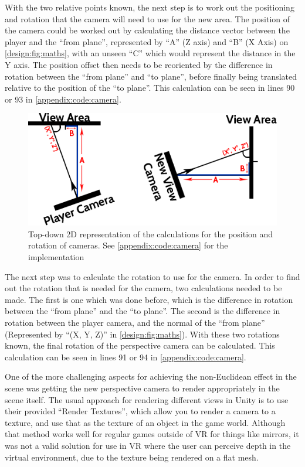 		With the two relative points known, the next step is to work out the positioning and rotation that the camera will need to use for the new area.
		The position of the camera could be worked out by calculating the distance vector between the player and the \enquote{from plane}, represented by \enquote{A} (Z axis) and \enquote{B} (X Axis) on \autoref{design:fig:maths}, with an unseen \enquote{C} which would represent the distance in the Y axis.
		The position offset then needs to be reoriented by the difference in rotation between the \enquote{from plane} and \enquote{to plane}, before finally being translated relative to the position of the \enquote{to plane}.
		This calculation can be seen in lines 90 or 93 in \autoref{appendix:code:camera}.

		\begin{figure}[h]
			\includegraphics[width=1\textwidth]{Images/Position}
			\centering
			\caption{Top-down 2D representation of the calculations for the position and rotation of cameras.
				See \autoref{appendix:code:camera} for the implementation}
			\label{design:fig:maths}
		\end{figure}

		The next step was to calculate the rotation to use for the camera.
		In order to find out the rotation that is needed for the camera, two calculations needed to be made.
		The first is one which was done before, which is the difference in rotation between the \enquote{from plane} and the \enquote{to plane}.
		The second is the difference in rotation between the player camera, and the normal of the \enquote{from plane} (Represented by \enquote{(X\degree, Y\degree, Z\degree)} in \autoref{design:fig:maths}).
		With these two rotations known, the final rotation of the perspective camera can be calculated.
		This calculation can be seen in lines 91 or 94 in \autoref{appendix:code:camera}.

		One of the more challenging aspects for achieving the non-Euclidean effect in the scene was getting the new perspective camera to render appropriately in the scene itself.
		The usual approach for rendering different views in Unity is to use their provided \enquote{Render Textures}, which allow you to render a camera to a texture, and use that as the texture of an object in the game world.
		Although that method works well for regular games outside of VR for things like mirrors, it was not a valid solution for use in VR where the user can perceive depth in the virtual environment, due to the texture being rendered on a flat mesh.

